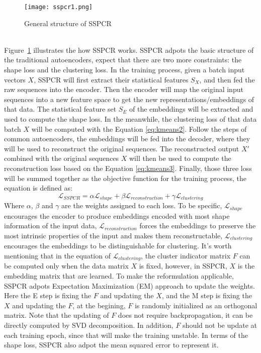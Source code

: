 \begin{figure}[!htbp]
    \centering
    \texttt{[image: sspcr1.png]}
    \caption{General structure of SSPCR}
    \label{fig:sspcr1}
\end{figure}
\\Figure~\ref{fig:sspcr1} illustrates the how SSPCR works. SSPCR adpots the basic structure of the traditional autoencoders, expect that there are two more constraints: the shape loss and the clustering loss. In the training process, given a batch input vectors $X$, SSPCR will first extract their statistical features $S_X$, and then fed the raw sequences into the encoder. Then the encoder will map the original input sequences into a new feature space to get the new representations/embeddings of that data. The statistical feature set $S_E$ of the embeddings will be extracted and used to compute the shape loss. In the meanwhile, the clustering loss of that data batch $X$ will be computed with the Equation \ref{eq:kmeans2}. Follow the steps of common autoencoders, the embeddings will be fed into the decoder, where they will be used to reconstruct the original sequences. The reconstructed output $X'$ combined with the original sequences $X$ will then be used to compute the reconstruction loss based on the Equation \ref{eq:kmeans3}. Finally, those three loss will be summed together as the objective function for the training process, the equation is defined as:
\begin{equation}
    \mathcal{L}_{SSPCR} = \alpha \mathcal{L}_{shape} + \beta \mathcal{L}_{reconstruction} + \gamma  \mathcal{L}_{clustering}
    \label{eq:objective}
\end{equation}
Where $\alpha$, $\beta$ and $\gamma$ are the weights assigned to each loss. To be specific, $\mathcal{L}_{shape}$ encourages the encoder to produce embeddings encoded with most shape information of the input data, $\mathcal{L}_{reconstruction}$ forces the embeddings to preserve the most intrinsic properties of the input and makes them reconstructable, $\mathcal{L}_{clustering}$ encourages the embeddings to be distinguishable for clustering. It's worth mentioning that in the equation of $\mathcal{L}_{clustering}$, the cluster indicator matrix $F$ can be computed only when the data matrix $X$ is fixed, however, in SSPCR, $X$ is the embedding matrix that are learned. To make the reformulation applicable, SSPCR adpots Expectation Maximization (EM) approach to update the weights. Here the E step is fixing the $F$ and updating the $X$, and the M step is fixing the $X$ and updating the $F$, at the begining, $F$ is randomly initialized as an orthogonal matrix. Note that the updating of $F$ does not require backpropagation, it can be directly computed by SVD decomposition. In addition, $F$ should not be update at each training epoch, since that will make the training unstable. In terms of the shape loss, SSPCR also adpot the mean squared error to represent it. 
